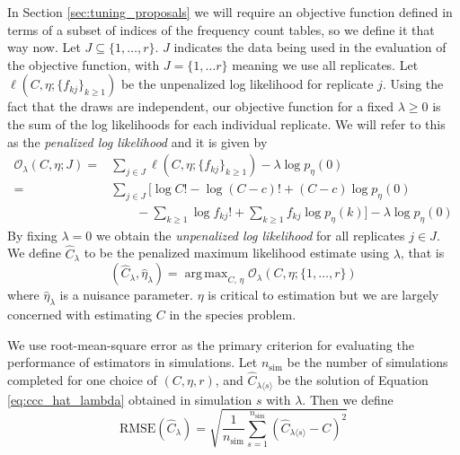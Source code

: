 \documentclass[oupdraft]{bio}
\DeclareMathOperator*{\argmax}{arg\,max}
\begin{document}
In Section \ref{sec:tuning_proposals} we will require an objective function defined in terms of a subset of indices of the frequency count tables, so we define it that way now.  Let $J \subseteq \{1, \dots, r\}$.  $J$ indicates the data being used in the evaluation of the objective function, with $J = \{1, \dots r\}$ meaning we use all replicates.  Let $\ell \left(C, \eta; \{f_{kj}\}_{k \geq 1} \right)$ be the unpenalized log likelihood for replicate $j$.  Using the fact that the draws are independent, our objective function for a fixed $\lambda \geq 0$ is the sum of the log likelihoods for each individual replicate.  We will refer to this as the \textit{penalized log likelihood} and it is given by
\begin{align}
\mathcal{O}_{\lambda}(C, \eta; J) =& \sum_{j \in J} \ell \left(C, \eta; \{f_{kj}\}_{k \geq 1} \right) - \lambda\log p_{\eta}(0) \\
 =& \sum_{j \in J} \biggl[ \log C! - \log (C-c)! + (C-c) \log p_\eta(0)  \nonumber \\
 & \qquad  - \sum_{k \geq 1} \log{} f_{kj}! + \sum_{k \geq 1} f_{kj} \log p_\eta(k) \biggr] - \lambda \log p_\eta(0)    \label{eq:objective}
\end{align}
By fixing $\lambda = 0$ we obtain the \textit{unpenalized log likelihood} for all replicates $j \in J$.  We define $\widehat{C}_{\lambda}$ to be the penalized maximum likelihood estimate using $\lambda$, that is
\begin{equation}
\left(\widehat{C}_{\lambda},  \widehat{\eta}_{\lambda} \right) = \argmax_{C, \, \eta}  \mathcal{O}_{\lambda} \left(C, \eta ; \{1, \dots , r\} \right) \label{eq:ccc_hat_lambda}
\end{equation}
where $\widehat{\eta}_{\lambda}$ is a nuisance parameter.  $\eta$ is critical to estimation but we are largely concerned with estimating $C$ in the species problem.

We use root-mean-square error as the primary criterion for evaluating the performance of estimators in simulations.  Let $n_{\text{sim}}$ be the number of simulations completed for one choice of $(C, \eta, r)$, and $\widehat{C}_{\lambda \langle s \rangle}$ be the solution of Equation \ref{eq:ccc_hat_lambda} obtained in simulation $s$ with  $\lambda$.  Then we define
\begin{equation}
 \text{RMSE}\left( \widehat{C}_{\lambda} \right) = \sqrt{ \frac{1}{n_{\text{sim}}} \sum_{s=1}^{n_{\text{sim}}} \left( \widehat{C}_{\lambda \langle s \rangle} - C\right)^2 }
\end{equation}
\end{document}
